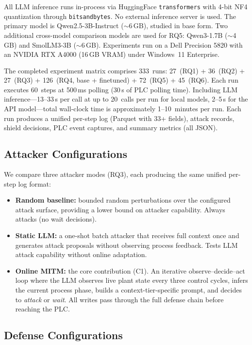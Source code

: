 All LLM inference runs in-process via HuggingFace \texttt{transformers} with 4-bit NF4 quantization through \texttt{bitsandbytes}. No external inference server is used. The primary model is Qwen2.5-3B-Instruct (${\sim}$6\,GB), studied in base form. Two additional cross-model comparison models are used for RQ5: Qwen3-1.7B (${\sim}$4\,GB) and SmolLM3-3B (${\sim}$6\,GB). Experiments run on a Dell Precision 5820 with an NVIDIA RTX A4000 (16\,GB VRAM) under Windows~11 Enterprise.

The completed experiment matrix comprises 333~runs: 27~(RQ1) + 36~(RQ2) + 27~(RQ3) + 126~(RQ4, base + finetuned) + 72~(RQ5) + 45~(RQ6). Each run executes 60~steps at 500\,ms polling (30\,s of PLC polling time). Including LLM inference---13--33\,s per call at up to 20~calls per run for local models, 2--5\,s for the API model---total wall-clock time is approximately 1--10~minutes per run. Each run produces a unified per-step log (Parquet with 33+ fields), attack records, shield decisions, PLC event captures, and summary metrics (all JSON).

\subsection{Attacker Configurations}

We compare three attacker modes (RQ3), each producing the same unified per-step log format:

\begin{itemize}[leftmargin=1.5em]
    \item \textbf{Random baseline:} bounded random perturbations over the configured attack surface, providing a lower bound on attacker capability. Always attacks (no wait decisions).
    \item \textbf{Static LLM:} a one-shot batch attacker that receives full context once and generates attack proposals without observing process feedback. Tests LLM attack capability without online adaptation.
    \item \textbf{Online MITM:} the core contribution (C1). An iterative observe--decide--act loop where the LLM observes live plant state every three control cycles, infers the current process phase, builds a context-tier-specific prompt, and decides to \emph{attack} or \emph{wait}. All writes pass through the full defense chain before reaching the PLC.
\end{itemize}

\subsection{Defense Configurations}

